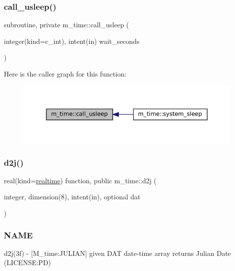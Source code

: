 \subsubsection{\texorpdfstring{call\+\_\+usleep()}{call\_usleep()}}
{\footnotesize\ttfamily subroutine, private m\+\_\+time\+::call\+\_\+usleep (\begin{DoxyParamCaption}\item[{integer(kind=c\+\_\+int), intent(in)}]{wait\+\_\+seconds }\end{DoxyParamCaption})\hspace{0.3cm}{\ttfamily [private]}}

Here is the caller graph for this function\+:\nopagebreak
\begin{figure}[H]
\begin{center}
\leavevmode
\includegraphics[width=350pt]{namespacem__time_ae63783f7479d2f5093c8031d38ce4304_icgraph}
\end{center}
\end{figure}
\mbox{\label{namespacem__time_a3fccc53c2650104eff084c7998d18f54}} 
\subsubsection{\texorpdfstring{d2j()}{d2j()}}
{\footnotesize\ttfamily real(kind=\mbox{\hyperlink{namespacem__time_ac10ea9e8d59ec74eaa7d89f2517d7422}{realtime}}) function, public m\+\_\+time\+::d2j (\begin{DoxyParamCaption}\item[{integer, dimension(8), intent(in), optional}]{dat }\end{DoxyParamCaption})}



\subsubsection*{N\+A\+ME}

d2j(3f) -\/ \mbox{[}M\+\_\+time\+:J\+U\+L\+I\+AN\mbox{]} given D\+AT date-\/time array returns Julian Date (L\+I\+C\+E\+N\+SE\+:PD) 


